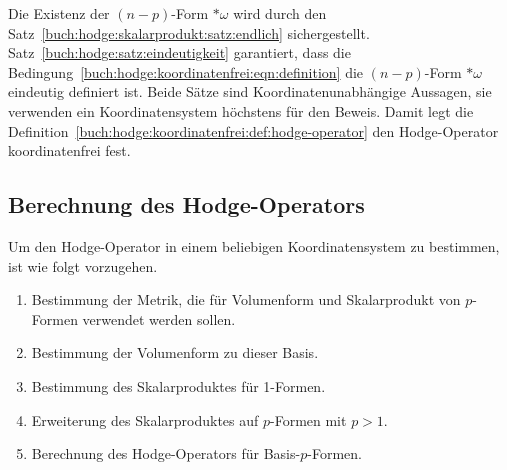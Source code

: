 Die Existenz der $(n-p)$-Form $\ast\omega$ wird durch den
Satz~\ref{buch:hodge:skalarprodukt:satz:endlich} sichergestellt.
Satz~\ref{buch:hodge:satz:eindeutigkeit} garantiert, dass die
Bedingung~\eqref{buch:hodge:koordinatenfrei:eqn:definition}
die $(n-p)$-Form $\ast\omega$ eindeutig definiert ist.
Beide Sätze sind Koordinatenunabhängige Aussagen, sie verwenden
ein Koordinatensystem höchstens für den Beweis.
Damit legt die
Definition~\ref{buch:hodge:koordinatenfrei:def:hodge-operator}
den Hodge-Operator koordinatenfrei fest.

%
%
\subsection{Berechnung des Hodge-Operators}
Um den Hodge-Operator in einem beliebigen Koordinatensystem zu
bestimmen, ist wie folgt vorzugehen.
\begin{enumerate}
\item
Bestimmung der Metrik, die für Volumenform und Skalarprodukt
von $p$-Formen verwendet werden sollen.
\item
Bestimmung der Volumenform zu dieser Basis.
\item
Bestimmung des Skalarproduktes für 1-Formen.
\item
Erweiterung des Skalarproduktes auf $p$-Formen mit $p>1$.
\item
Berechnung des Hodge-Operators für Basis-$p$-Formen.
\end{enumerate}

%
%

